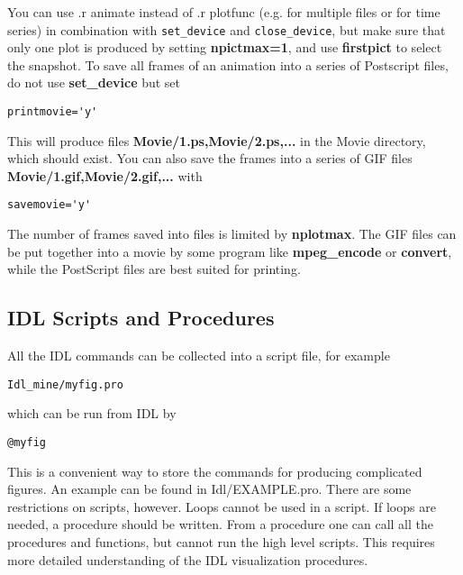 You can use .r animate instead of .r plotfunc (e.g. for multiple files or 
for time series) in combination with {\tt set\_device} and 
{\tt close\_device}, but make sure that only one plot is produced by setting
{\bf npictmax=1}, and use {\bf firstpict} to select the snapshot.
To save all frames of an animation into a series of Postscript files, 
do not use {\bf set\_device} but set
\begin{verbatim}
printmovie='y'
\end{verbatim}
This will produce files 
{\bf Movie/1.ps,Movie/2.ps,...} in the Movie directory, which should
exist. You can also save the frames into a series of GIF files 
{\bf Movie/1.gif,Movie/2.gif,...} with
\begin{verbatim}
savemovie='y'
\end{verbatim}
The number of frames saved into files is limited by {\bf nplotmax}.
The GIF files can be put together into a movie by some program like
{\bf mpeg\_encode} or {\bf convert}, 
while the PostScript files are best suited for printing. 

\subsection{IDL Scripts and Procedures \label{s-idl-script}}

All the IDL commands can be collected into a script file, for example 
\begin{verbatim}
Idl_mine/myfig.pro
\end{verbatim}
which can be run from IDL by
\begin{verbatim}
@myfig
\end{verbatim}
This is a convenient way to store the commands for producing complicated 
figures. An example can be found in Idl/EXAMPLE.pro. There are some
restrictions on scripts, however. Loops cannot be used in a script.
If loops are needed, a procedure should be written. From a procedure
one can call all the procedures and functions, but cannot run the
high level scripts. This requires more detailed understanding of the 
IDL visualization procedures.

%
